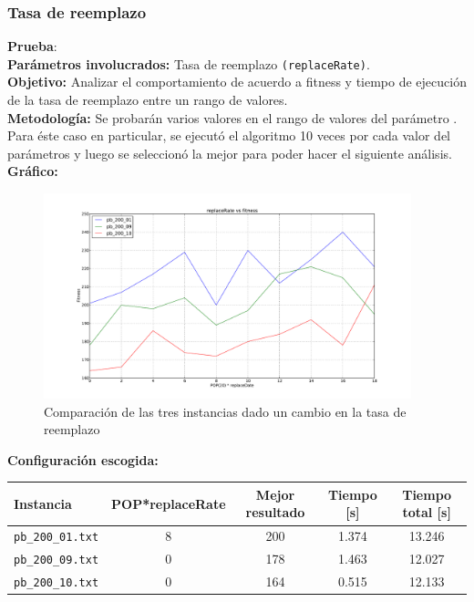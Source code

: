 \newpage
\subsubsection{Tasa de reemplazo}

\textbf{Prueba}: \\

\textbf{Parámetros involucrados:} Tasa de reemplazo \texttt{(replaceRate)}.\\

\textbf{Objetivo:} Analizar el comportamiento de acuerdo a fitness y tiempo de ejecución de la tasa de reemplazo entre un rango de valores.\\

\textbf{Metodología:} Se probarán varios valores en el rango de valores del parámetro \blue{[0,1]}.
Para éste caso en particular, se ejecutó el algoritmo 10 veces por cada valor del parámetros y luego se seleccionó la mejor
para poder hacer el siguiente análisis.\\

\textbf{Gráfico:}\\

\begin{figure}[h!]
\begin{center}
	\includegraphics[width=0.95\textwidth]{img/3.pdf}
	\caption{Comparaci\'on de las tres instancias dado un cambio en la tasa de reemplazo}
	\label{fig:3}
\end{center}
\end{figure}

\textbf{Configuración escogida:}\\

\begin{center}
\begin{tabular}{|l|c|c|c|c|}
	\hline
	\textbf{Instancia} & \textbf{POP*replaceRate} & \textbf{Mejor resultado} & \textbf{Tiempo [s]} & \textbf{Tiempo total [s]}\\\hline
	\texttt{pb\_200\_01.txt} & 8 & 200 & 1.374 & 13.246 \\\hline
	\texttt{pb\_200\_09.txt} & 0 & 178 & 1.463 & 12.027 \\\hline
	\texttt{pb\_200\_10.txt} & 0 & 164 & 0.515 & 12.133   \\\hline
\end{tabular}
\end{center}


